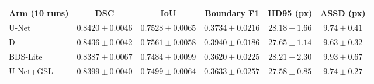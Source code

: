 \begin{tabular}{@{}lccccc@{}}
\toprule
Arm (10 runs) & DSC & IoU & Boundary F1 & HD95 (px) & ASSD (px) \\
\midrule
U-Net & $0.8420 \pm 0.0046$ & $0.7528 \pm 0.0065$ & $0.3734 \pm 0.0216$ & $28.18 \pm 1.66$ & $9.74 \pm 0.41$ \\
D & $0.8436 \pm 0.0042$ & $0.7561 \pm 0.0058$ & $0.3940 \pm 0.0186$ & $27.65 \pm 1.14$ & $9.63 \pm 0.32$ \\
BDS-Lite & $0.8387 \pm 0.0067$ & $0.7484 \pm 0.0099$ & $0.3620 \pm 0.0225$ & $28.21 \pm 2.30$ & $9.93 \pm 0.67$ \\
U-Net+GSL & $0.8399 \pm 0.0040$ & $0.7499 \pm 0.0064$ & $0.3633 \pm 0.0257$ & $27.58 \pm 0.85$ & $9.74 \pm 0.27$ \\
\bottomrule
\end{tabular}

